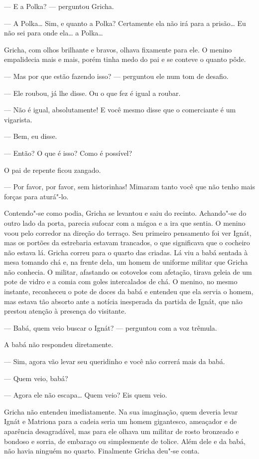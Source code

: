 --- E a Polka? --- perguntou Gricha.

--- A Polka\ldots{} Sim, e quanto a Polka? Certamente ela não irá para a
prisão\ldots{} Eu não sei para onde ela\ldots{} a Polka\ldots{}

Gricha, com olhos brilhante e bravos, olhava fixamente para ele. O
menino empalidecia mais e mais, porém tinha medo do pai e se conteve o
quanto pôde.

--- Mas por que estão fazendo isso? --- perguntou ele num tom de
desafio.

--- Ele roubou, já lhe disse. Ou o que fez é igual a roubar.

--- Não é igual, absolutamente! E você mesmo disse que o comerciante é
um vigarista.

--- Bem, eu disse.

--- Então? O que é isso? Como é possível?

O pai de repente ficou zangado.

--- Por favor, por favor, sem historinhas! Mimaram tanto você que não
tenho mais forças para aturá"-lo.

Contendo"-se como podia, Gricha se levantou e saiu do recinto. Achando"-se
do outro lado da porta, parecia sufocar com a mágoa e a ira que sentia.
O menino voou pelo corredor na direção do terraço. Seu primeiro
pensamento foi ver Ignát, mas os portões da estrebaria estavam
trancados, o que significava que o cocheiro não estava lá. Gricha correu
para o quarto das criadas. Lá viu a babá sentada à mesa tomando chá e,
na frente dela, um homem de uniforme militar que Gricha não conhecia. O
militar, afastando os cotovelos com afetação, tirava geleia de um pote
de vidro e a comia com goles intercalados de chá. O menino, no mesmo
instante, reconheceu o pote de doces da babá e entendeu que ela servia o
homem, mas estava tão absorto ante a notícia inesperada da partida de
Ignát, que não prestou atenção à presença do visitante.

--- Babá, quem veio buscar o Ignát? --- perguntou com a voz trêmula.

A babá não respondeu diretamente.

--- Sim, agora vão levar seu queridinho e você não correrá mais da babá.

--- Quem veio, babá?

--- Agora ele não escapa\ldots{} Quem veio? Eis quem veio.

Gricha não entendeu imediatamente. Na sua imaginação, quem deveria levar
Ignát e Matriona para a cadeia seria um homem gigantesco, ameaçador e de
aparência desagradável, mas para ele olhava um militar de rosto
bronzeado e bondoso e sorria, de embaraço ou simplesmente de tolice.
Além dele e da babá, não havia ninguém no quarto. Finalmente Gricha
deu"-se conta.

